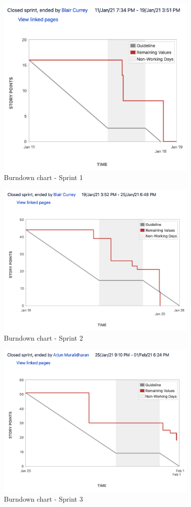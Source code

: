 \begin{figure}[H]
    \centering
    \includegraphics[width=10cm]{images/sprint1.png}
    \caption{Burndown chart - Sprint 1}
    \label{fig:sprint1}
\end{figure}

\begin{figure}[H]
    \centering
    \includegraphics[width=10cm]{images/sprint2.png}
    \caption{Burndown chart - Sprint 2}
    \label{fig:sprint2}
\end{figure}

\begin{figure}[H]
    \centering
    \includegraphics[width=10cm]{images/sprint3.png}
    \caption{Burndown chart - Sprint 3}
    \label{fig:sprint3}
\end{figure}

